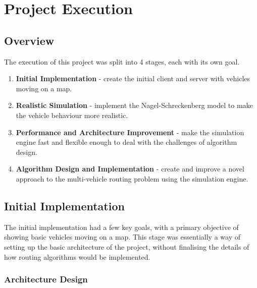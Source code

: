 \documentclass[ %
                    author={Alexander Hill},
                supervisor={Dr. Benjamin Sach},
                    degree={MEng},
                     title={MARMOSET},
                  subtitle={Multi-Agent Route Management using Online Simulation for Efficient Transportation},
                      type={research},
                      year={2016} ]{dissertation}
\begin{document}

\chapter{Project Execution}
\label{chap:execution}

\section{Overview}

The execution of this project was split into 4 stages, each with its own goal.

\begin{enumerate}
    \item \textbf{Initial Implementation} - create the initial client and
        server with vehicles moving on a map.
    \item \textbf{Realistic Simulation} - implement the Nagel-Schreckenberg
        model to make the vehicle behaviour more realistic.
    \item \textbf{Performance and Architecture Improvement} - make the
        simulation engine fast and flexible enough to deal with the challenges
        of algorithm design.
    \item \textbf{Algorithm Design and Implementation} - create and improve
        a novel approach to the multi-vehicle routing problem using the
        simulation engine.
\end{enumerate}

\section{Initial Implementation}

The initial implementation had a few key goals, with a primary objective of
showing basic vehicles moving on a map. This stage was essentially a way of
setting up the basic architecture of the project, without finalising the
details of how routing algorithms would be implemented.

\subsection{Architecture Design}
\end{document}
